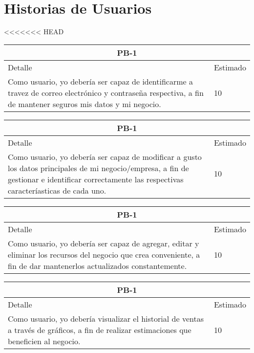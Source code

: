 \chapter{Historias de Usuarios}
<<<<<<< HEAD

\begin{table}[htbp]
	\begin{center}
		\begin{tabular}{|p{12cm} | p{2cm} |}
			\hline
			\multicolumn{2}{|c|}{PB-1}\\
			\hline
			Detalle & Estimado \\
			\hline
			Como usuario, yo debería ser capaz de identificarme a travez de correo electrónico y contraseña respectiva, a fin de mantener seguros mis datos y mi negocio.  & 10 \\
			\hline	
		\end{tabular}
	\end{center}
\end{table}
\begin{table}[htbp]
	\begin{center}
		\begin{tabular}{|p{12cm} | p{2cm} |}
			\hline
			\multicolumn{2}{|c|}{PB-1}\\
			\hline
			Detalle & Estimado \\
			\hline
			Como usuario, yo debería ser capaz de modificar a gusto los datos principales de mi negocio/empresa, a fin de gestionar e identificar correctamente las respectivas caracteríasticas de cada uno.& 10 \\
			\hline	
		\end{tabular}
	\end{center}
\end{table}
\begin{table}[htbp]
	\begin{center}
		\begin{tabular}{| p{12cm} | p{2cm} |}
			\hline
			\multicolumn{2}{|c|}{PB-1}\\
			\hline
			Detalle & Estimado \\
			\hline
			Como usuario, yo debería ser capaz de agregar, editar y eliminar los recursos del negocio que crea conveniente, a fin de dar mantenerlos actualizados constantemente.& 10 \\
			\hline	
		\end{tabular}
	\end{center}
\end{table}
\begin{table}[htbp]
	\begin{center}
		\begin{tabular}{| p{12cm} | p{2cm} |}
			\hline
			\multicolumn{2}{|c|}{PB-1}\\
			\hline
			Detalle & Estimado \\
			\hline
			Como usuario, yo debería visualizar el historial de ventas a través de gráficos, a fin de realizar estimaciones que beneficien al negocio.& 10 \\
			\hline	
		\end{tabular}
	\end{center}
\end{table}
